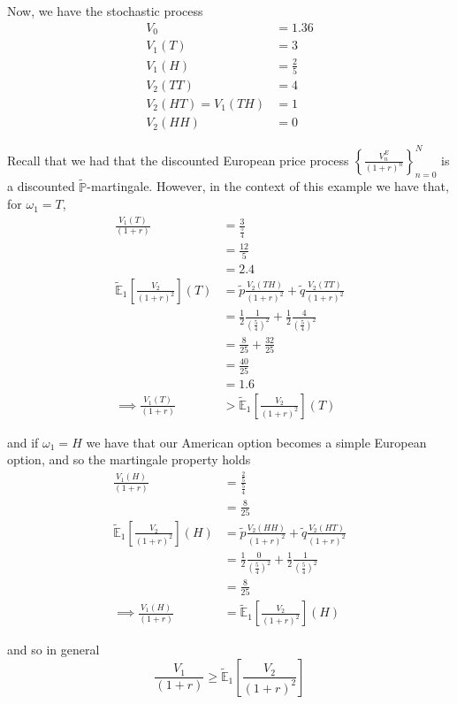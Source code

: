 \documentclass[12pt]{article}
\newlength\tindent
\renewcommand{\indent}{\hspace*{\tindent}}
\renewcommand{\P}{\mathbb P}
\newcommand{\E}{\mathbb E}
\begin{document}
Now, we have the stochastic process
\begin{align*}
	V_0 &= 1.36 \\
	V_1(T) &= 3 \\
	V_1(H) &= \frac{2}{5} \\
	V_2(TT) &= 4 \\
	V_2(HT) = V_1(TH) &= 1 \\
	V_2(HH) &= 0
\end{align*}

\indent Recall that we had that the discounted European price process $\left\{ \frac{V^E_n}{(1 + r)^n} \right\}^N_{n = 0}$ is a discounted $\tilde{\P}$-martingale. However, in the context of this example we have that, for $\omega_1 = T$,
\begin{align*}
	\frac{V_1(T)}{(1 + r)} &= \frac{3}{\frac{5}{4}} \\
	&= \frac{12}{5} \\
	&= 2.4 \\
	\tilde{\E}_1\left[ \frac{V_2}{(1 + r)^2} \right](T) &= \tilde{p}\frac{V_2(TH)}{(1 + r)^2} + \tilde{q}\frac{V_2(TT)}{(1 + r)^2} \\
	&= \frac{1}{2}\frac{1}{\left(\frac{5}{4}\right)^2} + \frac{1}{2}\frac{4}{\left(\frac{5}{4}\right)^2} \\
	&= \frac{8}{25} + \frac{32}{25} \\
	&= \frac{40}{25} \\
	&= 1.6 \\
	\implies \frac{V_1(T)}{(1 + r)} &> \tilde{\E}_1\left[ \frac{V_2}{(1 + r)^2} \right](T)
\end{align*}

and if $\omega_1 = H$ we have that our American option becomes a simple European option, and so the martingale property holds
\begin{align*}
	\frac{V_1(H)}{(1 + r)} &= \frac{ \frac{2}{5} }{\frac{5}{4}} \\
	&= \frac{8}{25} \\
	\tilde{\E}_1\left[ \frac{V_2}{(1 + r)^2} \right](H) &= \tilde{p}\frac{V_2(HH)}{(1 + r)^2} + \tilde{q}\frac{V_2(HT)}{(1 + r)^2} \\
	&= \frac{1}{2}\frac{0}{\left(\frac{5}{4}\right)^2} + \frac{1}{2}\frac{1}{\left(\frac{5}{4}\right)^2} \\
	&= \frac{8}{25} \\
	\implies \frac{V_1(H)}{(1 + r)} &= \tilde{\E}_1\left[ \frac{V_2}{(1 + r)^2} \right](H)
\end{align*}

and so in general
\begin{equation*}
	\frac{V_1}{(1 + r)} \geq \tilde{\E}_1\left[ \frac{V_2}{(1 + r)^2} \right]
\end{equation*}
\end{document}
